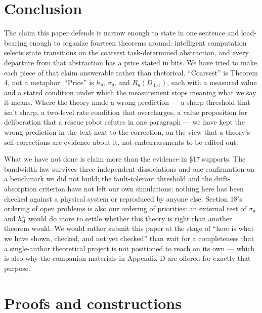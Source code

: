 \documentclass[11pt]{article}
\begin{document}
\hypertarget{conclusion}{%
\section{Conclusion}\label{conclusion}}

The claim this paper defends is narrow enough to state in one sentence and load-bearing enough to organize fourteen theorems around: intelligent computation selects state transitions on the coarsest task-determined abstraction, and every departure from that abstraction has a price stated in bits. We have tried to make each piece of that claim answerable rather than rhetorical. ``Coarsest'' is Theorem 4, not a metaphor. ``Price'' is \(h_\theta\), \(\sigma_\theta\), and \(R_\theta(D_{\mathrm{dist}})\), each with a measured value and a stated condition under which the measurement stops meaning what we say it means. Where the theory made a wrong prediction --- a sharp threshold that isn't sharp, a two-level rate condition that overcharges, a value proposition for deliberation that a rescue robot refutes in one paragraph --- we have kept the wrong prediction in the text next to the correction, on the view that a theory's self-corrections are evidence about it, not embarrassments to be edited out.

What we have not done is claim more than the evidence in \S{}17 supports. The bandwidth law survives three independent dissociations and one confirmation on a benchmark we did not build; the fault-tolerant threshold and the drift-absorption criterion have not left our own simulations; nothing here has been checked against a physical system or reproduced by anyone else. Section 18's ordering of open problems is also our ordering of priorities: an external test of \(\sigma_\theta\) and \(h_A^\perp\) would do more to settle whether this theory is right than another theorem would. We would rather submit this paper at the stage of ``here is what we have shown, checked, and not yet checked'' than wait for a completeness that a single-author theoretical project is not positioned to reach on its own --- which is also why the companion materials in Appendix D are offered for exactly that purpose.

\clearpage
\appendix

\hypertarget{proofs-and-constructions}{%
\section{Proofs and constructions}\label{proofs-and-constructions}}
\end{document}
